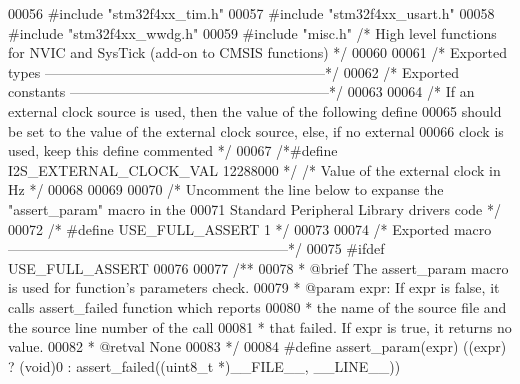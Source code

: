 \begin{DoxyCode}
00056 \textcolor{preprocessor}{#}\textcolor{preprocessor}{include} "stm32f4xx_tim.h"
00057 \textcolor{preprocessor}{#}\textcolor{preprocessor}{include} "stm32f4xx_usart.h"
00058 \textcolor{preprocessor}{#}\textcolor{preprocessor}{include} "stm32f4xx_wwdg.h"
00059 \textcolor{preprocessor}{#}\textcolor{preprocessor}{include} "misc.h"         \textcolor{comment}{/* High level functions for NVIC and SysTick (add-on to CMSIS functions) */}
00060 
00061 \textcolor{comment}{/* Exported types ------------------------------------------------------------*/}
00062 \textcolor{comment}{/* Exported constants --------------------------------------------------------*/}
00063 
00064 \textcolor{comment}{/* If an external clock source is used, then the value of the following define }
00065 \textcolor{comment}{   should be set to the value of the external clock source, else, if no external }
00066 \textcolor{comment}{   clock is used, keep this define commented */}
00067 \textcolor{comment}{/*#define I2S\_EXTERNAL\_CLOCK\_VAL   12288000 */} \textcolor{comment}{/* Value of the external clock in Hz */}
00068 
00069 
00070 \textcolor{comment}{/* Uncomment the line below to expanse the "assert\_param" macro in the }
00071 \textcolor{comment}{   Standard Peripheral Library drivers code */}
00072 \textcolor{comment}{/* #define USE\_FULL\_ASSERT    1 */}
00073 
00074 \textcolor{comment}{/* Exported macro ------------------------------------------------------------*/}
00075 \textcolor{preprocessor}{#}\textcolor{preprocessor}{ifdef}  \textcolor{preprocessor}{USE\_FULL\_ASSERT}
00076 
00077 \textcolor{comment}{/**}
00078 \textcolor{comment}{  * @brief  The assert\_param macro is used for function's parameters check.}
00079 \textcolor{comment}{  * @param  expr: If expr is false, it calls assert\_failed function which reports }
00080 \textcolor{comment}{  *         the name of the source file and the source line number of the call }
00081 \textcolor{comment}{  *         that failed. If expr is true, it returns no value.}
00082 \textcolor{comment}{  * @retval None}
00083 \textcolor{comment}{  */}
00084   \textcolor{preprocessor}{#}\textcolor{preprocessor}{define} \textcolor{preprocessor}{assert\_param}\textcolor{preprocessor}{(}\textcolor{preprocessor}{expr}\textcolor{preprocessor}{)} \textcolor{preprocessor}{(}\textcolor{preprocessor}{(}\textcolor{preprocessor}{expr}\textcolor{preprocessor}{)} \textcolor{preprocessor}{?} \textcolor{preprocessor}{(}\textcolor{preprocessor}{void}\textcolor{preprocessor}{)}0 \textcolor{preprocessor}{:} \textcolor{preprocessor}{assert\_failed}\textcolor{preprocessor}{(}\textcolor{preprocessor}{(}\textcolor{preprocessor}{uint8\_t} \textcolor{preprocessor}{*}\textcolor{preprocessor}{)}\textcolor{preprocessor}{\_\_FILE\_\_}\textcolor{preprocessor}{,} \textcolor{preprocessor}{\_\_LINE\_\_}\textcolor{preprocessor}{)}\textcolor{preprocessor}{)}

\end{DoxyCode}
